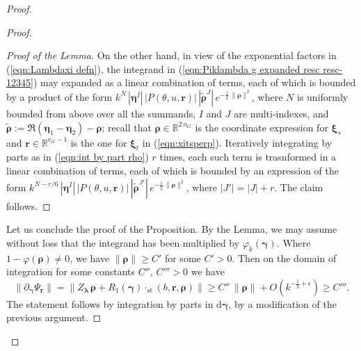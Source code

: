 \documentclass[12pt,a4paper]{article}
\theoremstyle{plain}
\theoremstyle{definition}
\begin{document}
\begin{proof}
\begin{proof}
\begin{proof}[Proof of the Lemma]
On the other hand, in view of the exponential factors in (\ref{eqn:Lambdaxi defn}), the integrand in 
(\ref{eqn:Piklambda g expanded resc resc-12345})
may expanded as a linear combination of terms, each of which
is bounded by a product of the form
$k^N\,|\boldsymbol{\eta}^I|\,|P(\theta,u,\mathbf{r})|\,
\left|\tilde{\boldsymbol{\rho}}^J\right|\,
e^{-\frac{1}{2}\,\|\boldsymbol{\rho}\|^2}$, where $N$ is
uniformly bounded from above over all the summands,
$I$ and $J$ are multi-indexes, and 
$\tilde{\boldsymbol{\rho}}
:=
\Re(\boldsymbol{\eta}_1-\boldsymbol{\eta}_2)-\boldsymbol{\rho}$;
recall that $\boldsymbol{\rho}\in \mathbb{R}^{2\,n_G}$
is the coordinate expression for $\boldsymbol{\xi}_s$
and $\mathbf{r}\in \mathbb{R}^{r_G-1}$ is the one for
$\boldsymbol{\xi}_t$ in (\ref{eqn:xitsperp}).
Iteratively integrating by parts as in (\ref{eqn:int by part rho}) $r$ times, each such term is trasnformed in 
a linear combination of terms, each of which
is bounded by an expression of the form
$k^{N-r/6}\,|\boldsymbol{\eta}^I|\,|P(\theta,u,\mathbf{r})|\,
\left|\tilde{\boldsymbol{\rho}}^{J'}\right|\,
e^{-\frac{1}{2}\,\|\boldsymbol{\rho}\|^2}$,
where $|J'|=|J|+r$. 
%
The claim follows.





\end{proof}
Let us conclude the proof of the Proposition.
By the Lemma,
we may assume without loss that the integrand has been
multiplied by $\varphi_k(\boldsymbol{\gamma})$.
Where $1-\varphi(\boldsymbol{\rho})\neq 0$,
we have $\|\boldsymbol{\rho}\|\ge C'$ for some
$C'>0$. Then on the domain of integration
for some constants $C'',\,C'''>0$
we have
$$
\|\partial_{\boldsymbol{\gamma}}\Psi_{\mathbf{r}}\|=
\|Z_{\boldsymbol{\lambda}}\,
\boldsymbol{\rho}+R_1(\boldsymbol{\gamma})\cdot_{\mathrm{st}}
(b,\mathbf{r},\boldsymbol{\rho})\|
\ge C''\,\|\boldsymbol{\rho}\|
+O\left(k^{-\frac{1}{3}+\epsilon}  \right)
\ge C'''.
$$
%
The statement follows by integration by parts in 
$\mathrm{d}\boldsymbol{\gamma}$, by a modification of
the previous argument.
\end{proof}


\end{proof}
\end{document}

